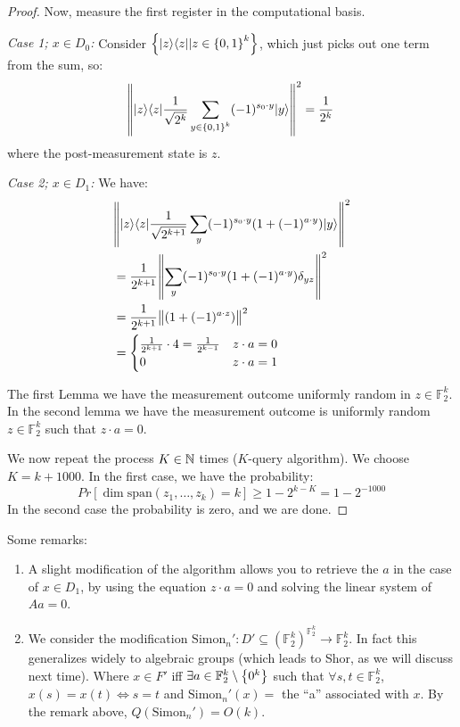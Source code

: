 \begin{proof}
    Now, measure the first register in the computational basis.

    \emph{Case 1; $x \in D_0$:} Consider $\set{\lvert z \rangle \langle z \rvert \vert z \in \set{0, 1}^k}$, which just picks out one term from the sum, so:
    \begin{equation}
        \norm{\lvert z \rangle \langle z \rvert \frac{1}{\sqrt{2^k}}\sum_{y \in \set{0, 1}^k}(-1)^{s_0 \cdot y}\lvert y \rangle}^2 = \frac{1}{2^k}
    \end{equation}
    where the post-measurement state is $z$.

    \emph{Case 2; $x \in D_1$:} We have:
    \begin{align}
       &\norm{\lvert z \rangle \langle z \rvert\frac{1}{\sqrt{2^{k+1}}}\sum_y (-1)^{s_0 \cdot y}(1 + (-1)^{a \cdot y})\lvert y \rangle}^2
       \\ &= \frac{1}{2^{k+1}}\norm{\sum_y (-1)^{s_0 \cdot y}(1 + (-1)^{a \cdot y})\delta_{yz}}^2
       \\ &= \frac{1}{2^{k+1}}\norm{(1 + (-1)^{a \cdot z})}^2
       \\ &= \begin{cases}
        \frac{1}{2^{k+1}} \cdot 4 = \frac{1}{2^{k-1}} & z \cdot a = 0
        \\ 0 & z \cdot a = 1
       \end{cases}
    \end{align}

    The first Lemma we have the measurement outcome uniformly random in $z \in \mathbb{F}_2^k$. In the second lemma we have the measurement outcome is uniformly random $z \in \mathbb{F}_2^k$ such that $z \cdot a = 0$. 

    We now repeat the process $K \in \mathbb{N}$ times ($K$-query algorithm). We choose $K = k + 1000$. In the first case, we have the probability:
    \begin{equation}
        Pr[\dim\text{span}(z_1, \ldots, z_k) = k] \geq 1 - 2^{k-K} = 1 - 2^{-1000}
    \end{equation}
    In the second case the probability is zero, and we are done.
\end{proof}

Some remarks:
\begin{enumerate}
    \item A slight modification of the algorithm allows you to retrieve the $a$ in the case of $x \in D_1$, by using the equation $z \cdot a = 0$ and solving the linear system of $Aa = 0$. 
    \item We consider the modification $\text{Simon}_n': D' \subseteq (\mathbb{F}_2^k)^{\mathbb{F}_2^k} \to \mathbb{F}_2^k$. In fact this generalizes widely to algebraic groups (which leads to Shor, as we will discuss next time). Where $x \in F'$ iff $\exists a \in \mathbb{F}_2^k \setminus \set{0^k}$ such that $\forall s, t \in \mathbb{F}_2^k$, $x(s) = x(t) \iff s = t$  and $\text{Simon}_n'(x) =$ the ``a'' associated with $x$. By the remark above, $Q(\text{Simon}_n') = O(k)$. 
\end{enumerate}

